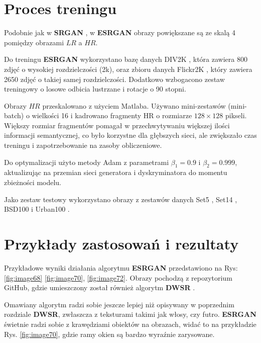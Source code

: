 \section{Proces treningu}

Podobnie jak w \textbf{SRGAN} \cite{Ledig_2017_CVPR}, w \textbf{ESRGAN} \cite{wang2018esrgan} obrazy powiększane są ze skalą 4 pomiędzy obrazami $LR$ a $HR$. 

Do treningu \textbf{ESRGAN} wykorzystano bazę danych DIV2K \cite{Agustsson_2017_CVPR_Workshops}, która zawiera 800 zdjęć o wysokiej rozdzielczości (2k), oraz zbioru danych Flickr2K %
, który zawiera 2650 zdjęć o takiej samej rozdzielczości. Dodatkowo wzbogacono zestaw treningowy o losowe odbicia lustrzane i rotacje o 90 stopni.


Obrazy $HR$ przeskalowano z użyciem Matlaba. Używano mini-zestawów (mini-batch) o wielkości 16 i kadrowano fragmenty HR o rozmiarze $128 \times 128$ pikseli. Większy rozmiar fragmentów pomagał w przechwytywaniu większej ilości informacji semantycznej, co było korzystne dla głębszych sieci, ale zwiększało czas treningu i zapotrzebowanie na zasoby obliczeniowe.

Do optymalizacji użyto metody Adam z parametrami \( \beta_1 = 0.9 \) i \( \beta_2 = 0.999 \), aktualizując na przemian sieci generatora i dyskryminatora do momentu zbieżności modelu.

Jako zestaw testowy wykorzystano obrazy z zestawów danych Set5 \cite{bevilacqua2012low}, Set14 \cite{zeyde2010single}, BSD100 \cite{martin2001database} i Urban100 \cite{Huang_2015_CVPR}.



\section{Przykłady zastosowań i rezultaty}

Przykładowe wyniki działania algorytmu \textbf{ESRGAN} przedstawiono na Rys: \ref{fig:image68} \ref{fig:image70}, \ref{fig:image72}. Obrazy pochodzą z repozytorium GitHub, gdzie umieszczony został również algorytm \textbf{DWSR} \cite{guo2017deep}.

Omawiany algorytm radzi sobie jeszcze lepiej niż opisywany w poprzednim rozdziale \textbf{DWSR}, zwłaszcza z teksturami takimi jak włosy, czy futro. \textbf{ESRGAN} świetnie radzi sobie z krawędziami obiektów na obrazach, widać to na przykładzie Rys. \ref{fig:image70}, gdzie ramy okien są bardzo wyraźnie zarysowane.

